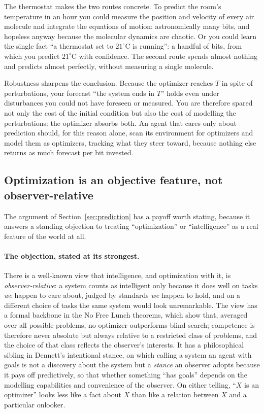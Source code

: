 \documentclass[10pt]{article}
\theoremstyle{definition}
\theoremstyle{remark}
\begin{document}
The thermostat makes the two routes concrete. To predict the room's temperature in an hour you could measure the position and velocity of every air molecule and integrate the equations of motion: astronomically many bits, and hopeless anyway because the molecular dynamics are chaotic. Or you could learn the single fact ``a thermostat set to $21^\circ\mathrm{C}$ is running'': a handful of bits, from which you predict $21^\circ\mathrm{C}$ with confidence. The second route spends almost nothing and predicts almost perfectly, without measuring a single molecule.

Robustness sharpens the conclusion. Because the optimizer reaches $T$ in spite of perturbations, your forecast ``the system ends in $T$'' holds even under disturbances you could not have foreseen or measured. You are therefore spared not only the cost of the initial condition but also the cost of modelling the perturbations: the optimizer absorbs both. An agent that cares only about prediction should, for this reason alone, scan its environment for optimizers and model them as optimizers, tracking what they steer toward, because nothing else returns as much forecast per bit invested.

\subsection{Optimization is an objective feature, not observer-relative}
\label{sec:objective}

The argument of Section~\ref{sec:prediction} has a payoff worth stating, because it answers a standing objection to treating ``optimization'' or ``intelligence'' as a real feature of the world at all.

\paragraph{The objection, stated at its strongest.} There is a well-known view that intelligence, and optimization with it, is \emph{observer-relative}: a system counts as intelligent only because it does well on tasks \emph{we} happen to care about, judged by standards \emph{we} happen to hold, and on a different choice of tasks the same system would look unremarkable. The view has a formal backbone in the No Free Lunch theorems, which show that, averaged over all possible problems, no optimizer outperforms blind search; competence is therefore never absolute but always relative to a restricted class of problems, and the choice of that class reflects the observer's interests. It has a philosophical sibling in Dennett's intentional stance, on which calling a system an agent with goals is not a discovery about the system but a \emph{stance} an observer adopts because it pays off predictively, so that whether something ``has goals'' depends on the modelling capabilities and convenience of the observer. On either telling, ``$X$ is an optimizer'' looks less like a fact about $X$ than like a relation between $X$ and a particular onlooker.
\end{document}
